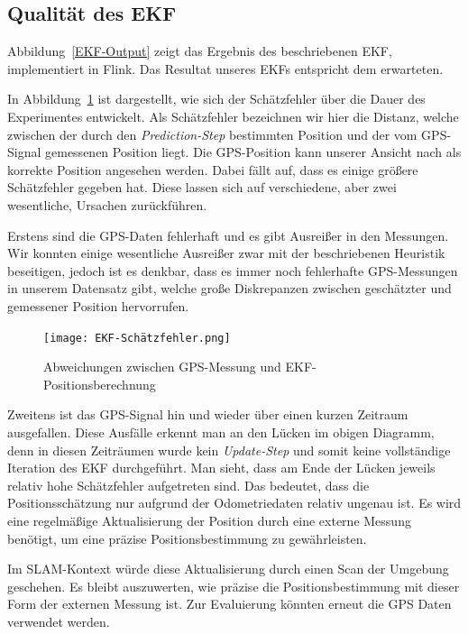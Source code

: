 \documentclass[11pt]{article}
\begin{document}
\subsection{Qualität des EKF}
Abbildung~\ref{EKF-Output} zeigt das Ergebnis des beschriebenen EKF, implementiert in Flink. Das Resultat unseres EKFs entspricht dem erwarteten.

In Abbildung~\ref{EKF-Schätzfehler} ist dargestellt, wie sich der Schätzfehler über die Dauer des Experimentes entwickelt. Als Schätzfehler bezeichnen wir hier die Distanz, welche zwischen der durch den \textit{Prediction-Step} bestimmten Position und der vom GPS-Signal gemessenen Position liegt. Die GPS-Position kann unserer Ansicht nach als korrekte Position angesehen werden. 
Dabei fällt auf, dass es einige größere Schätzfehler gegeben hat. Diese lassen sich auf verschiedene, aber zwei wesentliche, Ursachen zurückführen.


Erstens sind die GPS-Daten fehlerhaft und es gibt Ausreißer in den Messungen. Wir konnten einige wesentliche Ausreißer zwar mit der beschriebenen Heuristik beseitigen, jedoch ist es denkbar, dass es immer noch fehlerhafte GPS-Messungen in unserem Datensatz gibt, welche große Diskrepanzen zwischen geschätzter und gemessener Position hervorrufen.

\begin{figure}[H]
	\centering
	\texttt{[image: EKF-Schätzfehler.png]}
	\caption{Abweichungen zwischen GPS-Messung und EKF-Positionsberechnung}
	\label{EKF-Schätzfehler}
\end{figure}

Zweitens ist das GPS-Signal hin und wieder über einen kurzen Zeitraum ausgefallen. Diese Ausfälle erkennt man an den Lücken im obigen Diagramm, denn in diesen Zeiträumen wurde kein \textit{Update-Step} und somit keine vollständige Iteration des EKF durchgeführt. Man sieht, dass am Ende der Lücken jeweils relativ hohe Schätzfehler aufgetreten sind. Das bedeutet, dass die Positionsschätzung nur aufgrund der Odometriedaten relativ ungenau ist. Es wird eine regelmäßige Aktualisierung der Position durch eine externe Messung benötigt, um eine präzise Positionsbestimmung zu gewährleisten.



Im SLAM-Kontext würde diese Aktualisierung durch einen Scan der Umgebung geschehen. Es bleibt auszuwerten, wie präzise die Positionsbestimmung mit dieser Form der externen Messung ist. Zur Evaluierung könnten erneut die GPS Daten verwendet werden.
\end{document}
